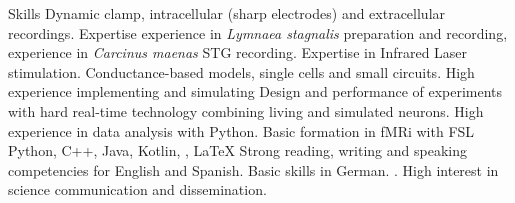 \begin{rubric}{Skills}
	Dynamic clamp, intracellular (sharp electrodes) and extracellular recordings. Expertise experience in \textit{Lymnaea stagnalis} preparation and recording, experience in \textit{Carcinus maenas} STG recording.
    Expertise in Infrared Laser stimulation.
    \large{Conductance-based models}, single cells and small circuits. High experience implementing and simulating 
 Design and performance of experiments with hard real-time technology combining living and simulated neurons. 
    High experience in data analysis with \large{Python}. 
    Basic formation in fMRi with FSL
	Python, C++, Java, Kotlin, , \LaTeX
{}
	Strong reading, writing and speaking competencies for English and Spanish. Basic skills in German.
. High interest in science communication and dissemination.

\end{rubric}
